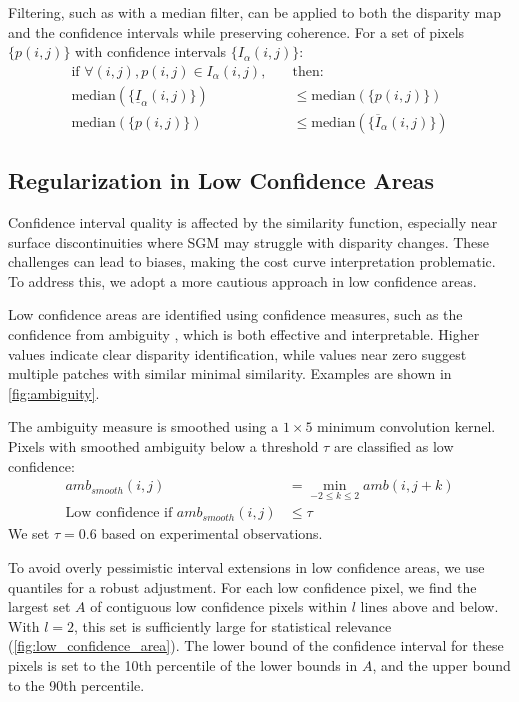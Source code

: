 Filtering, such as with a median filter, can be applied to both the disparity map and the confidence intervals while preserving coherence. For a set of pixels \( \{p(i,j)\} \) with confidence intervals \( \{I_\alpha(i,j)\} \):
\begin{align}
    \text{if } \forall (i,j), p(i,j) \in I_\alpha(i,j), \quad & \text{then:} \nonumber \\
    \text{median}(\{\underline{I}_\alpha(i,j)\}) &\leq \text{median}(\{p(i,j)\}) \label{eq:median_1} \\
    \text{median}(\{p(i,j)\}) &\leq \text{median}(\{\overline{I}_\alpha(i,j)\}) \label{eq:median_2}
\end{align}

\subsection{Regularization in Low Confidence Areas}\label{subsec:regularization}

Confidence interval quality is affected by the similarity function, especially near surface discontinuities where SGM may struggle with disparity changes. These challenges can lead to biases, making the cost curve interpretation problematic. To address this, we adopt a more cautious approach in low confidence areas.

Low confidence areas are identified using confidence measures, such as the confidence from ambiguity \cite{sarrazin_ambiguity_2021}, which is both effective and interpretable. Higher values indicate clear disparity identification, while values near zero suggest multiple patches with similar minimal similarity. Examples are shown in \cref{fig:ambiguity}.

The ambiguity measure is smoothed using a \(1 \times 5\) minimum convolution kernel. Pixels with smoothed ambiguity below a threshold \( \tau \) are classified as low confidence:
\begin{align}
    amb_{smooth}(i,j) &= \min_{-2 \leq k \leq 2} amb(i, j+k) \\
    \text{Low confidence if } amb_{smooth}(i,j) &\leq \tau \label{eq:low_confidence}
\end{align}
We set \( \tau = 0.6 \) based on experimental observations.

To avoid overly pessimistic interval extensions in low confidence areas, we use quantiles for a robust adjustment. For each low confidence pixel, we find the largest set \( A \) of contiguous low confidence pixels within \( l \) lines above and below. With \( l = 2 \), this set is sufficiently large for statistical relevance (\cref{fig:low_confidence_area}). The lower bound of the confidence interval for these pixels is set to the 10th percentile of the lower bounds in \( A \), and the upper bound to the 90th percentile.

